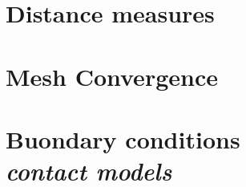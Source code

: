 \documentclass[a4paper,12pt,twoside]{report}
\begin{document}
\clearemptydoublepage


\label{chapter:thesisreview}


\clearemptydoublepage

\begin{appendices}
\clearemptydoublepage
\chapter{Distance measures}
\label{appendice:distancemeasures}


\chapter{Mesh Convergence}\label{appendice:meshconvergence}


\chapter{Buondary conditions \\ \textit{contact models}}\label{appendice:contactmodels}

\label{appendix:contactSurface}

\end{appendices}
\clearemptydoublepage


%




%
\end{document}
